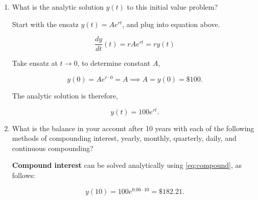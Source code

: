 \documentclass[11pt,oneside]{extarticle}
\newcommand{\Dollar}{\$}
\begin{document}
\begin{enumerate}

    \item What is the analytic solution $y(t)$ to this initial value problem?

        Start with the ensatz $y(t)=Ae^{rt}$, and plug into equation above.

        $$
        \frac{dy}{dt}(t) =
        rAe^{rt} = ry(t)
        $$

        Take ensatz at $t\rightarrow 0$, to determine constant $A$,
        
        $$
        y(0)=Ae^{r\cdot 0} = A
        \implies
        A = y(0) = \Dollar 100.
        $$

        The analytic solution is therefore,

        \begin{equation}
            y(t)=100e^{rt}.
            \label{eq:compound}
        \end{equation}

    \item What is the balance in your account after 10 years with each of the
        following methods of compounding interest, yearly, monthly, quarterly,
        daily, and continuous compounding?

        \par {\bf Compound interest} can be solved analytically using 
        \ref{eq:compound}, as follows:

        $$
        y(10) = 100 e^{0.06\cdot 10} = \Dollar182.21.
        $$

\end{enumerate}
\end{document}
